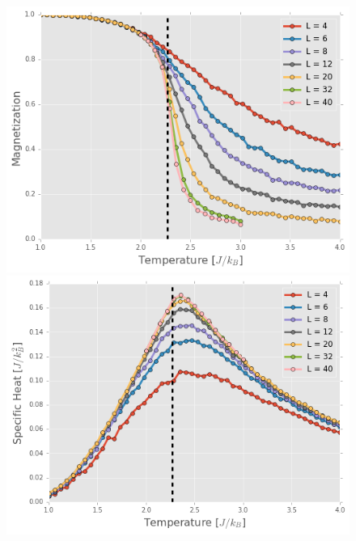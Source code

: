 \documentclass[11pt, oneside]{article}
\begin{document}
\begin{figure}
\begin{minipage}{0.47\textwidth}
    \includegraphics[width=\linewidth]{img/2D/mag}
    \end{minipage}
    \hspace{\fill} %
    \begin{minipage}{0.47\textwidth}
    \includegraphics[width=\linewidth]{img/2D/C}
    \end{minipage}
    
    \vspace*{0cm} %


\end{figure}
\end{document}
